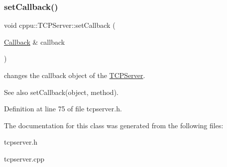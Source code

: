 \subsubsection{\texorpdfstring{setCallback()}{setCallback()}\hspace{0.1cm}{\footnotesize\ttfamily [2/2]}}
{\footnotesize\ttfamily void cppu\+::\+T\+C\+P\+Server\+::set\+Callback (\begin{DoxyParamCaption}\item[{\mbox{\hyperlink{structcppu_1_1_t_c_p_server_1_1_callback}{Callback}} \&}]{callback }\end{DoxyParamCaption})\hspace{0.3cm}{\ttfamily [inline]}}



changes the callback object of the \mbox{\hyperlink{classcppu_1_1_t_c_p_server}{T\+C\+P\+Server}}. 

\begin{DoxySeeAlso}{See also}
set\+Callback(object, method). 
\end{DoxySeeAlso}


Definition at line 75 of file tcpserver.\+h.


\begin{DoxyCode}{0}

\end{DoxyCode}


The documentation for this class was generated from the following files\+:\begin{DoxyCompactItemize}
\item 
tcpserver.\+h\item 
tcpserver.\+cpp\end{DoxyCompactItemize}

